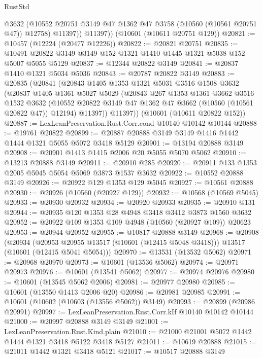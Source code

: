 \begin{lexlean}{RustStd}
\begin{coremodule}
            @3632
            (@10552 @20751 @3149 @47 @1362 @47 @3758 (@10560 (@10561 @20751 @47)) @12758)
            @11397))
        @11397))
    (@10601 (@10611 @20751 @129))
@20821 := @10457 (@12224 (@20477 @12226))
@20822 := @20821 @20751
@20835 := @10491 @20822 @3149 @3149 @152 @1321 @1410 @1445 @1321 @5038 @152 @5007 @5055 @5129
@20837 := @12344 @20822 @3149
@20841 := @20837 @1410 @1321 @5034 @5036
@20843 := @20787 @20822 @3149
@20883 := @20835
    (@20841
      (@20843
        @1405
        @1353
        @1321
        @5031
        @3516
        @1508
        @3632
        (@20837
          @1405
          @1361
          @5027
          @5029
          (@20843
            @267
            @1353
            @1361
            @3662
            @3516
            @1532
            @3632
            (@10552 @20822 @3149 @47 @1362 @47 @3662 (@10560 (@10561 @20822 @47)) @12194)
            @11397))
        @11397))
    (@10601 (@10611 @20822 @152))
@20887 := LexLeanPreservation.Rust.Corr.cond @10140 @10142 @10144
@20888 := @19761 @20822
@20899 := @20887 @20888 @3149 @3149 @1416 @1442 @1444 @1321 @5055 @5072 @3418 @5129
@20901 := @13194 @20888 @3149
@20908 := @20901 @1413 @1415 @2006 @20 @5055 @5070 @5062
@20910 := @13213 @20888 @3149
@20911 := @20910 @285
@20920 := @20911 @133 @1353 @2005 @5045 @5054 @5069 @3873 @1537 @3632
@20922 := @10552 @20888 @3149
@20926 := @20922 @129 @1353 @129 @5045
@20927 := @10561 @20888
@20930 := @20926 (@10560 (@20927 @129))
@20932 := @10568 (@10569 @5045)
@20933 := @20930 @20932
@20934 := @20920 @20933
@20935 := @20910 @131
@20944 := @20935 @120 @1353 @28 @4948 @3418 @3412 @3873 @1560 @3632
@20952 := @20922 @109 @1353 @109 @4948 (@10560 (@20927 @109)) @20623
@20953 := @20944 @20952
@20955 := @10817 @20888 @3149
@20968 := @20908
    (@20934
      (@20953 @20955 @13517 (@10601 (@12415 @5048 @3418)))
      @13517
      (@10601 (@12415 @5041 @5054)))
@20970 := @13531 (@13532 @5062)
@20971 := @20968 @20970
@20973 := @10601 (@13536 @5062)
@20974 := @20971 @20973
@20976 := @10601 (@13541 @5062)
@20977 := @20974 @20976
@20980 := @10601 (@13545 @5062 @2006)
@20981 := @20977 @20980
@20985 := @10601 (@13550 @1413 @2006 @20)
@20986 := @20981 @20985
@20991 := @10601 (@10602 (@10603 (@13556 @5062)) @3149)
@20993 := @20899 (@20986 @20991)
@20997 := LexLeanPreservation.Rust.Corr.kIf @10140 @10142 @10144
@21000 := @20997 @20888 @3149 @3149
@21001 := LexLeanPreservation.Rust.Kind.plain
@21010 := @21000 @21001 @5072 @1442 @1444 @1321 @3418 @5122 @3418 @5127
@21011 := @10619 @20888
@21015 := @21011 @1442 @1321 @3418 @5121
@21017 := @10517 @20888 @3149

\end{coremodule}
\end{lexlean}
